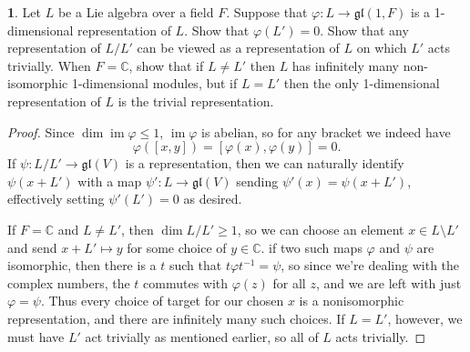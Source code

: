 \documentclass[12pt]{article}
\DeclareMathOperator{\im}{im}
\newcommand{\gl}{\mathfrak{gl}}
\theoremstyle{definition}
\newtheorem{ex}{}
\begin{document}
\begin{ex}
	Let $L$ be a Lie algebra over a field $F$.
	Suppose that $\varphi : L \to \gl(1, F)$ is a 1-dimensional representation of $L$.
	Show that $\varphi(L') = 0$.
	Show that any representation of $L/L'$ can be viewed as a representation of $L$ on which $L'$ acts trivially.
	When $F = \mathbb{C}$, show that if $L \neq L'$ then $L$ has infinitely many non-isomorphic 1-dimensional modules, but if $L = L'$ then the only 1-dimensional representation of $L$ is the trivial representation.
\end{ex}
\begin{proof}
  Since $\dim\im\varphi \leq 1$, $\im\varphi$ is abelian, so for any bracket we indeed have \begin{equation*}
    \varphi([x, y]) = [\varphi(x), \varphi(y)] = 0.
  \end{equation*}
  If $\psi : L/L' \to \gl(V)$ is a representation, then we can naturally identify $\psi(x + L')$ with a map $\psi' : L \to \gl(V)$ sending $\psi'(x) = \psi(x + L')$, effectively setting $\psi'(L') = 0$ as desired.

  If $F = \mathbb{C}$ and $L \neq L'$, then $\dim L/L' \geq 1$, so we can choose an element $x \in L \setminus L'$ and send $x + L' \mapsto y$ for some choice of $y \in \mathbb{C}$.
  if two such maps $\varphi$ and $\psi$ are isomorphic, then there is a $t$ such that $t\varphi t^{-1} = \psi$, so since we're dealing with the complex numbers, the $t$ commutes with $\varphi(z) $ for all $z$, and we are left with just $\varphi = \psi$.
  Thus every choice of target for our chosen $x$ is a nonisomorphic representation, and there are infinitely many such choices.
  If $L = L'$, however, we must have $L'$ act trivially as mentioned earlier, so all of $L$ acts trivially.
\end{proof}
\end{document}
